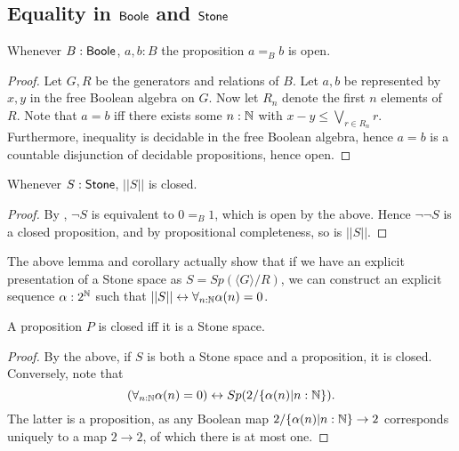 \subsection{Equality in $\mathsf{Boole}$ and $\mathsf{Stone}$}
\begin{lemma}\label{BooleEqualityOpen}
  Whenever $B:\mathsf{Boole}$, $a,b:B$ the proposition $a=_Bb$ is open. 
\end{lemma}
\begin{proof}
  Let $G,R$ be the generators and relations of $B$. 
  Let $a,b$ be represented by $x,y$ in the free Boolean algebra on $G$. 
  Now let $R_n$ denote the first $n$ elements of $R$. 
  Note that $a=b$ iff there exists some $n:\mathbb{N}$ with $x-y \leq \bigvee_{r\in R_n} r$. 
  Furthermore, inequality is decidable in the free Boolean algebra, hence
  $a=b$ is a countable disjunction of decidable propositions, hence open. 
\end{proof}


\begin{corollary}\label{TruncationStoneClosed}
  Whenever $S:\mathsf{Stone}$, $||S||$ is closed. 
\end{corollary}
\begin{proof}
  By , $\neg S$ is equivalent to $0=_B 1$, which is open by the above. 
  Hence $\neg \neg S$ is a closed proposition, and by propositional completeness, so is $||S||$. 
\end{proof}

\begin{remark}\label{ExplicitTruncationStoneClosed}
  The above lemma and corollary actually show that if we have an explicit 
  presentation of a Stone space as $S = Sp(\langle G \rangle / R)$, 
  we can construct an explicit sequence $\alpha:2^{\mathbb{N}}$ such that $||S|| \leftrightarrow \forall_{n:\mathbb{N}} \alpha(n) = 0$. 
\end{remark}


\begin{corollary}\label{PropositionsClosedIffStone}
  A proposition $P$ is closed iff it is a Stone space. 
\end{corollary}
\begin{proof}
  By the above, if $S$ is both a Stone space and a proposition, it is closed. 
  Conversely, note that 
  $$
  (\forall_{n:\mathbb{N}} \alpha(n) = 0 )\leftrightarrow Sp(2/\{\alpha(n)| n:\mathbb{N}\}).
  $$
  The latter is a proposition, as
  any Boolean map $2/\{\alpha(n)|n:\mathbb{N}\} \to 2$
  corresponds uniquely to a map $2\to 2$, of which there is at most one. 
\end{proof}

